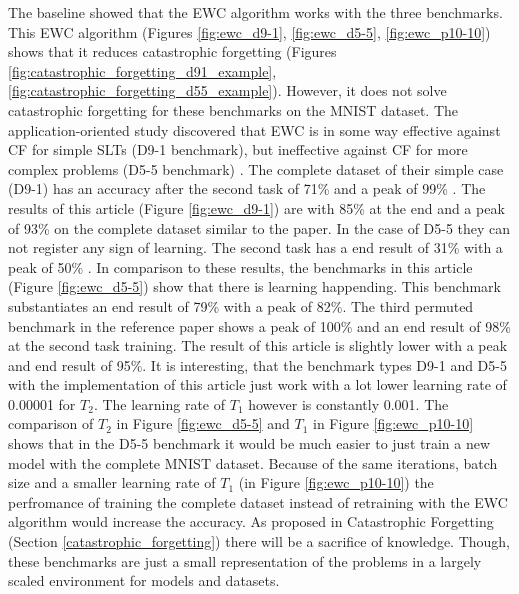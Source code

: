 The baseline showed that the EWC algorithm works with the three benchmarks.
This EWC algorithm (Figures \ref{fig:ewc_d9-1}, \ref{fig:ewc_d5-5}, \ref{fig:ewc_p10-10}) shows that it reduces catastrophic forgetting (Figures \ref{fig:catastrophic_forgetting_d91_example}, \ref{fig:catastrophic_forgetting_d55_example}).
However, it does not solve catastrophic forgetting for these benchmarks on the MNIST dataset.
\newline
The application-oriented study \cite{cf_application_oriented_study} discovered that EWC is in some way effective against CF for simple SLTs (D9-1 benchmark), but ineffective against CF for more complex problems (D5-5 benchmark) \cite{cf_application_oriented_study}.
The complete dataset of their simple case (D9-1) has an accuracy after the second task of 71\% and a peak of 99\% \cite{cf_application_oriented_study}.
The results of this article (Figure \ref{fig:ewc_d9-1}) are with 85\% at the end and a peak of 93\% on the complete dataset similar to the paper.
In the case of D5-5 they can not register any sign of learning.
The second task has a end result of 31\% with a peak of 50\% \cite{cf_application_oriented_study}.
In comparison to these results, the benchmarks in this article (Figure \ref{fig:ewc_d5-5}) show that there is learning happending.
This benchmark substantiates an end result of 79\% with a peak of 82\%.
The third permuted benchmark in the reference paper \cite{cf_application_oriented_study} shows a peak of 100\% and an end result of 98\% at the second task training.
The result of this article is slightly lower with a peak and end result of 95\%.
\newline
It is interesting, that the benchmark types D9-1 and D5-5 with the implementation of this article just work with a lot lower learning rate of 0.00001 for $T_2$.
The learning rate of $T_1$ however is constantly 0.001.
\newline
The comparison of $T_2$ in Figure \ref{fig:ewc_d5-5} and $T_1$ in Figure \ref{fig:ewc_p10-10} shows that in the D5-5 benchmark it would be much easier to just train a new model with the complete MNIST dataset.
Because of the same iterations, batch size and a smaller learning rate of $T_1$ (in Figure \ref{fig:ewc_p10-10}) the perfromance of training the complete dataset instead of retraining with the EWC algorithm would increase the accuracy.
As proposed in Catastrophic Forgetting (Section \ref{catastrophic_forgetting}) there will be a sacrifice of knowledge.
Though, these benchmarks are just a small representation of the problems in a largely scaled environment for models and datasets.
